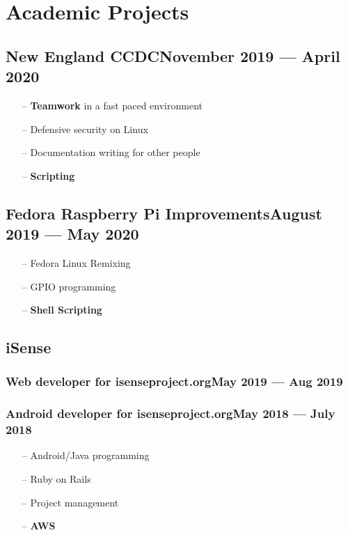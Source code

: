 \documentclass[11pt]{article}
\begin{document}
\section{Academic Projects}

\subsection{{\bf New England CCDC}\dotfill November 2019 --- April 2020 }
	\begin{multicols}{2}
		\begin{itemize}[noitemsep, topsep=0pt]
			\item[--] {\bf Teamwork} in a fast paced environment
			\item[--] Defensive security on Linux
			\item[--] Documentation writing for other people
			\item[--] {\bf Scripting}
		\end{itemize}

		\noindent
	\end{multicols}

\subsection{{\bf Fedora Raspberry Pi Improvements}\dotfill August 2019 --- May 2020 }
	\begin{multicols}{2}
		\begin{itemize}[noitemsep, topsep=0pt]
			\item[--] Fedora Linux Remixing
			\item[--] GPIO programming
			\item[--] {\bf Shell Scripting}
		\end{itemize}

		\noindent
	\end{multicols}

\subsection{\bfseries iSense}
\subsubsection{Web developer for isenseproject.org\dotfill May 2019 --- Aug 2019}
\subsubsection{Android developer for isenseproject.org\dotfill May 2018 --- July 2018}
	\begin{multicols}{2}
		\begin{itemize}[noitemsep, topsep=0pt]
			\item[--] Android/Java programming
			\item[--] Ruby on Rails
			\item[--] Project management
			\item[--] {\bf AWS}
		\end{itemize}

		\noindent
	\end{multicols}
\end{document}
